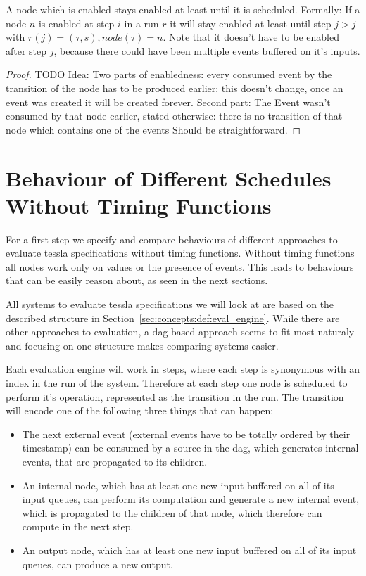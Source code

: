 \begin{lemma}[name = Duration of Enabledness]\label{lemma:enabled_till_scheduled}
  A node which is enabled stays enabled at least until it is scheduled.
  Formally: If a node \(n\) is enabled at step \(i\) in a run \(r\) it will stay enabled at least until step \(j > j\) with \(r(j) = (\tau,s), \mathit{node}(\tau) = n\).
  Note that it doesn't have to be enabled after step \(j\), because there could have been multiple events buffered on it's inputs.
\end{lemma}

\begin{proof}
TODO Idea: Two parts of enabledness: every consumed event by the transition of the node has to be produced earlier: this doesn't change, once an event was created it will be created forever.
Second part: The Event wasn't consumed by that node earlier, stated otherwise: there is no transition of that node which contains one of the events
Should be straightforward.
\end{proof}


\section{Behaviour of Different Schedules Without Timing Functions}
\label{sec:concepts:behaviour_without_timing}

For a first step we specify and compare behaviours of different approaches to evaluate \gls{tessla} specifications without timing functions.
Without timing functions all nodes work only on values or the presence of events.
This leads to behaviours that can be easily reason about, as seen in the next sections.

All systems to evaluate \gls{tessla} specifications we will look at are based on the described structure in Section~\ref{sec:concepts:def:eval_engine}.
While there are other approaches to evaluation, a \gls{dag} based approach seems to fit most naturaly and focusing on one structure makes comparing systems easier.

Each evaluation engine will work in steps, where each step is synonymous with an index in the run of the system.
Therefore at each step one node is scheduled to perform it's operation, represented as the transition in the run.
The transition will encode one of the following three things that can happen:

\begin{itemize}
  \item The next external event (external events have to be totally ordered by their timestamp) can be consumed by a source in the \gls{dag}, which generates internal events, that are propagated to its children.
  \item An internal node, which has at least one new input buffered on all of its input queues, can perform
    its computation and generate a new internal event, which is propagated to the children of that node, which therefore can compute in the next step.
  \item An output node, which has at least one new input buffered on all of its input queues, can produce a new output.
\end{itemize}

